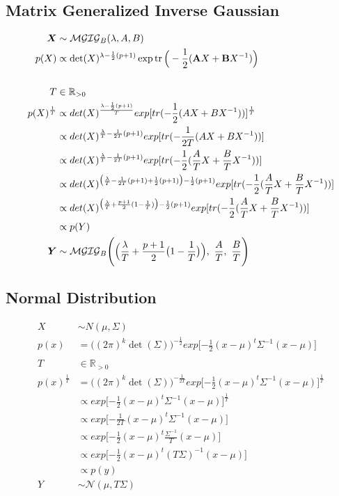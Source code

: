 \subsection{Matrix Generalized Inverse Gaussian}
\begin{align*}
\bm{X} &\sim \mathcal{MGIG}_B(\lambda, A, B) \\
p({X}) &\propto \det({X})^{\lambda - \frac{1}{2}(p+1)}
\exp \tr
\Big(
-\frac{1}{2} (\matr{A}{X} + \matr{B} {X}^{-1} )
\Big)
\\ \\ 
T &\in \mathbb{R}_{>0}
\\
p(X)^{\frac{1}{T}}
&\propto det(X)^{\frac{{\lambda - \frac{1}{2}(p+1)}}{T}} exp \lbrack tr(-\frac{1}{2}(AX + BX^{-1} ))\rbrack^{\frac{1}{T}}
\\
&\propto det(X)^{\frac{\lambda}{T} - \frac{1}{2T}(p+1)} exp \lbrack tr(-\frac{1}{2T}(AX + BX^{-1} ))\rbrack
\\
&\propto det(X)^{\frac{\lambda}{T} - \frac{1}{2T}(p+1)} exp \lbrack tr(-\frac{1}{2}(\frac{A}{T}X + \frac{B}{T}X^{-1} ))\rbrack
\\
&\propto det(X)^{\big({\frac{\lambda}{T} - \frac{1}{2T}(p+1)} + \frac{1}{2}(p+1)\big) - \frac{1}{2}(p+1)} exp \lbrack tr(-\frac{1}{2}(\frac{A}{T}X + \frac{B}{T}X^{-1} ))\rbrack
\\
&\propto det(X)^{\big(\frac{\lambda}{T} + \frac{p+1}{2}(1-\frac{1}{T})\big) - \frac{1}{2}(p+1)} exp \lbrack tr(-\frac{1}{2}(\frac{A}{T}X + \frac{B}{T}X^{-1} ))\rbrack
\\
&\propto p(Y) 
\\
\bm{Y} &\sim \mathcal{MGIG}_B\Bigg(\Big(\frac{\lambda}{T} + \frac{p+1}{2}\big(1-\frac{1}{T}\big)\Big), \ \frac{A}{T},\ \frac{B}{T}\Bigg)
\end{align*}
\subsection{Normal Distribution}

\begin{align*}
{X} &\sim N(\mu, \Sigma)
\\
p(x) &= \big( (2\pi)^k \det{(\Sigma)}\big)^{-\frac{1}{2}} exp \lbrack - \frac{1}{2} (x-\mu)^t \Sigma^{-1} (x-\mu) \rbrack
\\ \\ 
T &\in \mathbb{R}_{>0} 
\\
p(x)^{\frac{1}{T}}&= \big( (2\pi)^k \det{(\Sigma)}\big)^{-\frac{1}{2T}} 
exp \lbrack - \frac{1}{2} (x-\mu)^t \Sigma^{-1} (x-\mu) \rbrack^{\frac{1}{T}}
\\
&\propto exp \lbrack - \frac{1}{2} (x-\mu)^t \Sigma^{-1} (x-\mu) \rbrack^{\frac{1}{T}}
\\
&\propto exp \lbrack - \frac{1}{2T} (x-\mu)^t \Sigma^{-1} (x-\mu) \rbrack
\\
&\propto exp \lbrack - \frac{1}{2} (x-\mu)^t \frac{\Sigma^{-1}}{T} (x-\mu) \rbrack
\\
&\propto exp \lbrack - \frac{1}{2} (x-\mu)^t (T \Sigma)^{-1} (x-\mu) \rbrack
\\
&\propto p(y) 
\\
Y &\sim \mathcal{N}(\mu, T \Sigma)
\end{align*}

